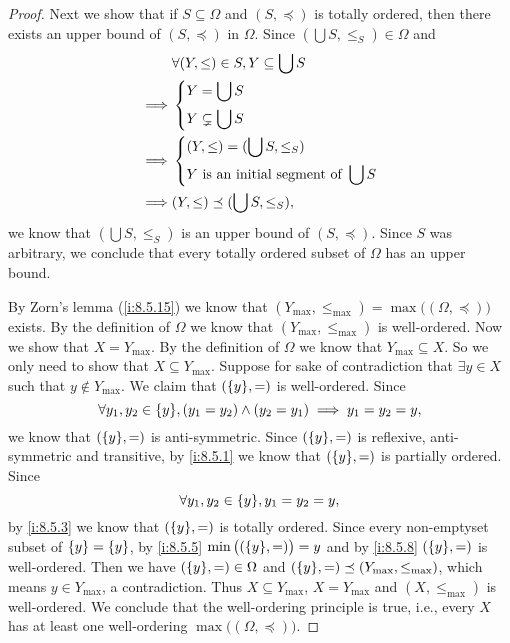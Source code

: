 \begin{proof}
  Next we show that if \(S \subseteq \Omega\) and \((S, \preceq)\) is totally ordered, then there exists an upper bound of \((S, \preceq)\) in \(\Omega\).
  Since \((\bigcup S, \leq_S) \in \Omega\) and
  \begin{align*}
             & \forall (Y, \leq) \in S, Y \subseteq \bigcup S \\
    \implies & \begin{dcases}
                 Y = \bigcup S \\
                 Y \subsetneq \bigcup S
               \end{dcases}                          \\
    \implies & \begin{dcases}
                 (Y, \leq) = (\bigcup S, \leq_S) \\
                 Y \text{ is an initial segment of } \bigcup S
               \end{dcases}   \\
    \implies & (Y, \leq) \preceq (\bigcup S, \leq_S),
  \end{align*}
  we know that \((\bigcup S, \leq_S)\) is an upper bound of \((S, \preceq)\).
  Since \(S\) was arbitrary, we conclude that every totally ordered subset of \(\Omega\) has an upper bound.

  By Zorn's lemma (\cref{i:8.5.15}) we know that \((Y_{\max}, \leq_{\max}) = \max\big((\Omega, \preceq)\big)\) exists.
  By the definition of \(\Omega\) we know that \((Y_{\max}, \leq_{\max})\) is well-ordered.
  Now we show that \(X = Y_{\max}\).
  By the definition of \(\Omega\) we know that \(Y_{\max} \subseteq X\).
  So we only need to show that \(X \subseteq Y_{\max}\).
  Suppose for sake of contradiction that \(\exists y \in X\) such that \(y \notin Y_{\max}\).
  We claim that \((\set{y}, =)\) is well-ordered.
  Since
  \[
    \forall y_1, y_2 \in \set{y}, (y_1 = y_2) \land (y_2 = y_1) \implies y_1 = y_2 = y,
  \]
  we know that \((\set{y}, =)\) is anti-symmetric.
  Since \((\set{y}, =)\) is reflexive, anti-symmetric and transitive, by \cref{i:8.5.1} we know that \((\set{y}, =)\) is partially ordered.
  Since
  \[
    \forall y_1, y_2 \in \set{y}, y_1 = y_2 = y,
  \]
  by \cref{i:8.5.3} we know that \((\set{y}, =)\) is totally ordered.
  Since every non-emptyset subset of \(\left\lbrace y\right\rbrace = \left\lbrace y\right\rbrace\), by \cref{i:8.5.5} \(\min\big((\set{y}, =)\big) = y\) and by \cref{i:8.5.8} \((\set{y}, =)\) is well-ordered.
  Then we have \((\set{y}, =) \in \Omega\) and \((\set{y}, =) \preceq (Y_{\max}, \leq_{\max})\), which means \(y \in Y_{\max}\), a contradiction.
  Thus \(X \subseteq Y_{\max}\), \(X = Y_{\max}\) and \((X, \leq_{\max})\) is well-ordered.
  We conclude that the well-ordering principle is true, i.e., every \(X\) has at least one well-ordering \(\max\big((\Omega, \preceq)\big)\).


\end{proof}
